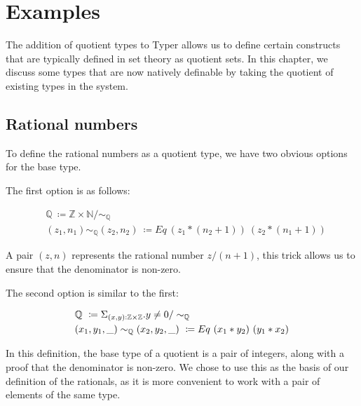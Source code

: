 \documentclass[12pt,twoside,maitrise]{dms}
\theoremstyle{definition}
\numberwithin{equation}{section}
\numberwithin{table}{chapter}
\numberwithin{figure}{chapter}
\begin{document}
\chapter{Examples}\label{ch:examples}
The addition of quotient types to Typer allows us to define certain constructs
that are typically defined in set theory as quotient sets. In this chapter, we
discuss some types that are now natively definable by taking the quotient of
existing types in the system.

\section{Rational numbers}
To define the rational numbers as a quotient type, we have two obvious options for the base type.

The first option is as follows:

\begin{align*}
  & \mathbb{Q} \ \coloneqq \mathbb{Z} \times \mathbb{N} / \sim_{\mathbb{Q}} \\
  & (z_1 , n_1) \sim_{\mathbb{Q}} (z_2 , n_2) \ \coloneqq Eq \ (z_1 * (n_2 + 1)) \ (z_2 * (n_1 + 1))
\end{align*}

A pair $(z , n)$ represents the rational number $z / (n + 1)$, this trick allows us to ensure that the denominator is non-zero.

The second option is similar to the first:

\begin{align*}
  & \mathbb{Q} \ \coloneqq \Sigma_{\oftype{(x, y)}{\mathbb{Z} \times \mathbb{Z}}} . y \ne 0 / \sim_{\mathbb{Q}} \\
  & (x_1 , y_1, \_) \sim_{\mathbb{Q}} (x_2 , y_2, \_) \ \coloneqq Eq \ (x_1 * y_2) \ (y_1 * x_2)
\end{align*}

In this definition, the base type of a quotient is a pair of integers, along
with a proof that the denominator is non-zero. We chose to use this as the basis
of our definition of the rationals, as it is more convenient to work with a pair
of elements of the same type.
\end{document}
